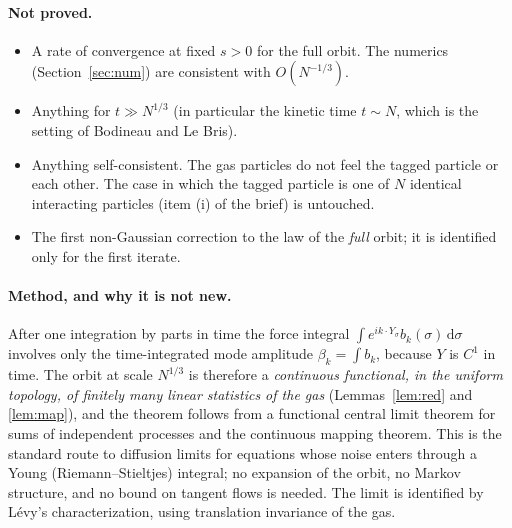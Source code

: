 \documentclass[11pt]{article}
\newcommand{\dd}{\mathrm{d}}
\theoremstyle{remark}
\begin{document}
\paragraph{Not proved.}
\begin{itemize}
  \item A rate of convergence at fixed $s>0$ for the full orbit. The numerics
    (Section~\ref{sec:num}) are consistent with $O(N^{-1/3})$.
  \item Anything for $t\gg N^{1/3}$ (in particular the kinetic time $t\sim N$,
    which is the setting of Bodineau and Le Bris).
  \item Anything self-consistent. The gas particles do not feel the tagged
    particle or each other. The case in which the tagged particle is one of
    $N$ identical interacting particles (item (i) of the brief) is untouched.
  \item The first non-Gaussian correction to the law of the \emph{full}
    orbit; it is identified only for the first iterate.
\end{itemize}

\paragraph{Method, and why it is not new.} After one integration by parts in
time the force integral $\int e^{ik\cdot Y_\sigma}b_k(\sigma)\,\dd\sigma$
involves only the time-integrated mode amplitude
$\beta_k=\int b_k$, because $Y$ is $C^1$ in time. The orbit at scale
$N^{1/3}$ is therefore a \emph{continuous functional, in the uniform
topology, of finitely many linear statistics of the gas}
(Lemmas~\ref{lem:red} and \ref{lem:map}), and the theorem follows from a
functional central limit theorem for sums of independent processes and the
continuous mapping theorem. This is the standard route to diffusion limits
for equations whose noise enters through a Young (Riemann--Stieltjes)
integral; no expansion of the orbit, no Markov structure, and no bound on
tangent flows is needed. The limit is identified by L\'evy's
characterization, using translation invariance of the gas.
\end{document}
